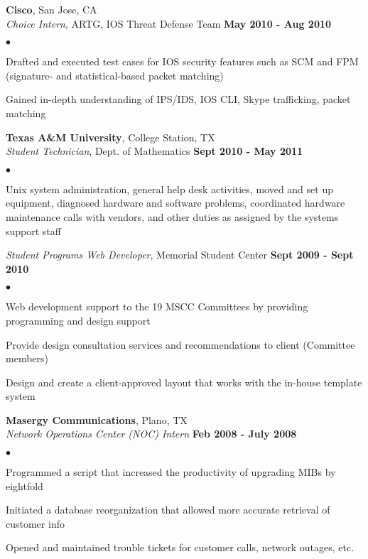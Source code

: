 \documentclass[margin,line]{res}
\newenvironment{list2}{
  \begin{list}{$\bullet$}{%
      \setlength{\itemsep}{0in}
      \setlength{\parsep}{0in} \setlength{\parskip}{0in}
      \setlength{\topsep}{0in} \setlength{\partopsep}{0in} 
      \setlength{\leftmargin}{0.18in}}}{\end{list}}
\begin{document}
\begin{resume}
{\bf Cisco}, San Jose, CA \\
{\em Choice Intern}, ARTG, IOS Threat Defense Team \hfill {\bf May 2010 - Aug 2010}\\
\vspace{-3mm}
\begin{list2}
\item Drafted and executed test cases for IOS security features such as SCM and FPM
  (signature- and statistical-based packet matching)
\item Gained in-depth understanding of IPS/IDS, IOS CLI, Skype trafficking, packet matching
\end{list2}

{\bf Texas A\&M University}, College Station, TX \\
{\em Student Technician}, Dept. of Mathematics \hfill {\bf Sept 2010 - May 2011} \\
\vspace{-3mm}
\begin{list2}
\item Unix system administration, general help desk activities, moved and set up
  equipment, diagnosed hardware and software problems, coordinated hardware maintenance
  calls with vendors, and other duties as assigned by the systems support staff
\end{list2}

{\em Student Programs Web Developer}, Memorial Student Center \hfill {\bf Sept 2009 - Sept 2010} \\
\vspace{-3mm}
\begin{list2}
\item Web development support to the 19 MSCC Committees by providing programming and design support
\item Provide design consultation services and recommendations to client (Committee members)
\item Design and create a client-approved layout that works with the in-house template system
\end{list2}

{\bf Masergy Communications}, Plano, TX \\
{\em Network Operations Center (NOC) Intern} \hfill {\bf Feb 2008 - July 2008} \\
\vspace{-3mm}
\begin{list2}
\item Programmed a script that increased the productivity of upgrading MIBs by eightfold
\item Initiated a database reorganization that allowed more accurate retrieval of customer info
\item Opened and maintained trouble tickets for customer calls, network outages, etc.
\end{list2}


\end{resume}
\end{document}
